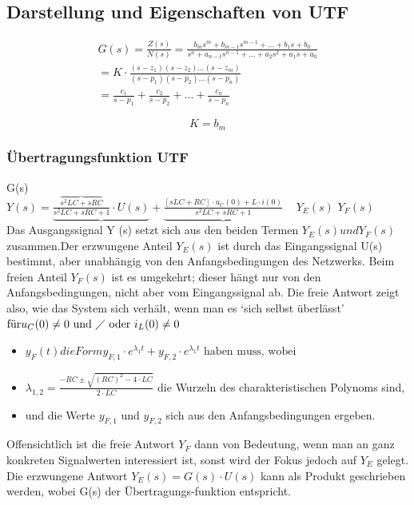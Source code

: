 \subsection{Darstellung und Eigenschaften von UTF}

\begin{eqnarray}
G(s)=\frac{Z(s)}{N(s)}=\frac{b_{m}s^m + b_{m-1}s^{m-1}+ ... + b_{1}s+b_{0}}{s^{n}+a_{n-1}s^{n-1} + ... + a_{2}s^{2}+a_{1}s + a_{0}} \\ = K\cdot \frac{(s-z_{1})(s-z_{2})...(s-z_{m})}{(s-p_{1})(s-p_{2})...(s-p_{n})} \\ = \frac{c_{1}}{s-p_{1}} + \frac{c_{2}}{s-p_{2}} + ...  + \frac{c_{n}}{s-p_{n}}
\end{eqnarray}

\begin{equation}
K=b_{m}
\end{equation}
\subsubsection{Übertragungsfunktion UTF}
\hspace{2.3cm}G(s)\\
$Y(s) = \underbrace{\frac{\overbrace{s^2 LC+sRC}}{s^2 LC +sRC +1}\cdot U(s)} + \underbrace{\frac{[sLC + RC] \cdot u_{C}(0) + L \cdot i(0)}{s^2 LC +sRC +1}}$ \newline
\textcolor{white}{x} \hspace{2.4cm} $Y_{E}(s)$ \hspace{3.8cm} $Y_{F}(s)$ \\
Das Ausgangssignal Y (s) setzt sich aus den beiden Termen $Y_{E}(s) und Y_{F}(s)$ zusammen.Der erzwungene Anteil $Y_{E}(s)$ ist durch das Eingangssignal U(s) bestimmt, aber unabhängig von den Anfangsbedingungen des Netzwerks.
Beim freien Anteil $Y_{F}(s)$ ist es umgekehrt; dieser hängt nur von den Anfangsbedingungen,
nicht aber vom Eingangssignal ab. Die freie Antwort zeigt also, wie
das System sich verhält, wenn man es ‘sich selbst überlässt’
$\text{für} u_{C}(0) \neq 0 \text{ und } \diagup \text{ oder } i_{L}(0) \neq 0$
\begin{itemize}
	\item $ y_{F}(t) die Form y_{F,1} \cdot e^{\lambda_{1}t} + y_{F,2} \cdot e^{\lambda_{1}t} \text{ haben muss, wobei}$
	\item $ \lambda_{1,2}= \frac{-RC \pm \sqrt{(RC)^2 - 4 \cdot LC} }{2 \cdot LC}$ die Wurzeln des charakteristischen Polynoms sind,
	\item und die Werte $y_{F,1} \text{ und } y_{F,2}$ sich aus den Anfangsbedingungen ergeben.
\end{itemize}
Offensichtlich ist die freie Antwort $Y_{F}$ dann von Bedeutung, wenn man an ganz konkreten
Signalwerten interessiert ist, sonst wird der Fokus jedoch auf $Y_{E}$ gelegt. \\
Die erzwungene Antwort $Y_{E}(s) = G(s) \cdot U(s)$ kann als Produkt geschrieben werden, wobei G(s) der Übertragungs-funktion entspricht.

